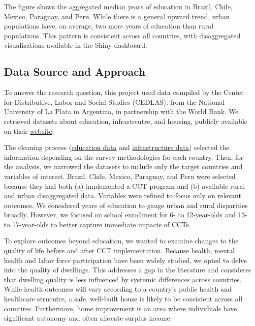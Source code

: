 \documentclass[
  10pt,
]{article}
\begin{document}
The figure shows the aggregated median years of education in Brazil,
Chile, Mexico, Paraguay, and Peru. While there is a general upward
trend, urban populations have, on average, two more years of education
than rural populations. This pattern is consistent across all countries,
with disaggregated visualizations available in the Shiny dashboard.

\subsection{Data Source and Approach}\label{data-source-and-approach}

To answer the research question, this project used data compiled by the
Center for Distributive, Labor and Social Studies (CEDLAS), from the
National University of La Plata in Argentina, in partnership with the
World Bank. We retrieved datasets about education, infrastrcutre, and
housing, publicly available on their
\href{https://www.cedlas.econo.unlp.edu.ar/wp/en/estadisticas/sedlac/estadisticas/}{website}.

The cleaning process (\href{./cleaning_education.qmd}{education data}
and \href{./cleaning_infraestructure.qmd}{infrastructure data}) selected
the information depending on the survey methodologies for each country.
Then, for the analysis, we narrowed the datasets to include only the
target countries and variables of interest. Brazil, Chile, Mexico,
Paraguay, and Peru were selected because they had both (a) implemented a
CCT program and (b) available rural and urban disaggregated data.
Variables were refined to focus only on relevant outcomes. We considered
years of education to gauge urban and rural disparities broadly.
However, we focused on school enrollment for 6- to 12-year-olds and 13-
to 17-year-olds to better capture immediate impacts of CCTs.

To explore outcomes beyond education, we wanted to examine changes to
the quality of life before and after CCT implementation. Because health,
mental health and labor force participation have been widely studied, we
opted to delve into the quality of dwellings. This addresses a gap in
the literature and consideres that dwelling quality is less influenced
by systemic differences across countries. While health outcomes will
vary according to a country's public health and healthcare strucutre, a
safe, well-built house is likely to be consistent across all countires.
Furthermore, home improvement is an area where individuals have
significant autonomy and often allocate surplus income.
\end{document}

